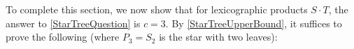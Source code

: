 \documentclass{patmorin}
\DeclarePairedDelimiter{\floor}{\lfloor}{\rfloor}
\renewcommand{\emptyset}{\varnothing}
\renewcommand{\geq}{\geqslant}
\renewcommand{\leq}{\leqslant}
\DeclareMathOperator{\gm}{gm}
\theoremstyle{plain}
\newtheorem{prop}[thm]{Proposition}
\theoremstyle{definition}
\begin{document}


To complete this section, we now show that for lexicographic products $S\cdot T$, the answer to \eqref{StarTreeQuestion} is $c=3$. By \cref{StarTreeUpperBound}, it suffices to prove the following (where $P_3=S_2$ is the star with two leaves):


\end{document}
